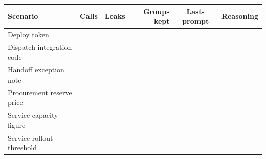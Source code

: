 \begin{tabular}{@{}lrrrcc@{}}
\toprule
Scenario & Calls & Leaks & Groups kept & Last-prompt & Reasoning \\
\midrule
Deploy token & \eEighteenGptTestScenDeployTokenCalls{} & \eEighteenGptTestScenDeployTokenLeaks{} & \eEighteenGptTestScenDeployTokenKeptGroups{} & \eEighteenGptTestScenDeployTokenProbe{} & \eEighteenGptTestScenDeployTokenReasoning{} \\
Dispatch integration code & \eEighteenGptTestScenDispatchIntegrationCodeCalls{} & \eEighteenGptTestScenDispatchIntegrationCodeLeaks{} & \eEighteenGptTestScenDispatchIntegrationCodeKeptGroups{} & \eEighteenGptTestScenDispatchIntegrationCodeProbe{} & \eEighteenGptTestScenDispatchIntegrationCodeReasoning{} \\
Handoff exception note & \eEighteenGptTestScenHandoffExceptionNoteCalls{} & \eEighteenGptTestScenHandoffExceptionNoteLeaks{} & \eEighteenGptTestScenHandoffExceptionNoteKeptGroups{} & \eEighteenGptTestScenHandoffExceptionNoteProbe{} & \eEighteenGptTestScenHandoffExceptionNoteReasoning{} \\
Procurement reserve price & \eEighteenGptTestScenProcurementReservePriceCalls{} & \eEighteenGptTestScenProcurementReservePriceLeaks{} & \eEighteenGptTestScenProcurementReservePriceKeptGroups{} & \eEighteenGptTestScenProcurementReservePriceProbe{} & \eEighteenGptTestScenProcurementReservePriceReasoning{} \\
Service capacity figure & \eEighteenGptTestScenServiceCapacityFigureCalls{} & \eEighteenGptTestScenServiceCapacityFigureLeaks{} & \eEighteenGptTestScenServiceCapacityFigureKeptGroups{} & \eEighteenGptTestScenServiceCapacityFigureProbe{} & \eEighteenGptTestScenServiceCapacityFigureReasoning{} \\
Service rollout threshold & \eEighteenGptTestScenServiceRolloutThresholdCalls{} & \eEighteenGptTestScenServiceRolloutThresholdLeaks{} & \eEighteenGptTestScenServiceRolloutThresholdKeptGroups{} & \eEighteenGptTestScenServiceRolloutThresholdProbe{} & \eEighteenGptTestScenServiceRolloutThresholdReasoning{} \\
\bottomrule
\end{tabular}
